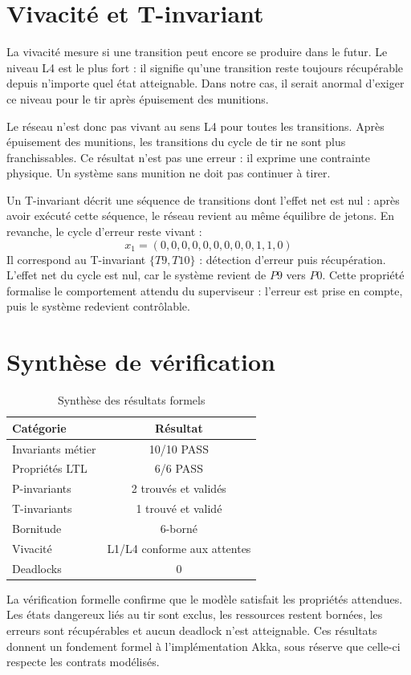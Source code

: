 \documentclass[11pt,a4paper]{report}
\begin{document}
\section{Vivacité et T-invariant}
La vivacité mesure si une transition peut encore se produire dans le futur. Le niveau L4 est le plus fort : il signifie qu'une transition reste toujours récupérable depuis n'importe quel état atteignable. Dans notre cas, il serait anormal d'exiger ce niveau pour le tir après épuisement des munitions.

Le réseau n'est donc pas vivant au sens L4 pour toutes les transitions. Après épuisement des munitions, les transitions du cycle de tir ne sont plus franchissables. Ce résultat n'est pas une erreur : il exprime une contrainte physique. Un système sans munition ne doit pas continuer à tirer.

Un T-invariant décrit une séquence de transitions dont l'effet net est nul : après avoir exécuté cette séquence, le réseau revient au même équilibre de jetons. En revanche, le cycle d'erreur reste vivant :
\[
x_1 = (0,0,0,0,0,0,0,0,0,1,1,0)
\]
Il correspond au T-invariant $\{T9,T10\}$ : détection d'erreur puis récupération. L'effet net du cycle est nul, car le système revient de $P9$ vers $P0$. Cette propriété formalise le comportement attendu du superviseur : l'erreur est prise en compte, puis le système redevient contrôlable.

\section{Synthèse de vérification}
\begin{table}[H]
\centering
\caption{Synthèse des résultats formels}
\begin{tabularx}{0.8\textwidth}{YC}
\toprule
Catégorie & Résultat \\
\midrule
Invariants métier & 10/10 PASS \\
Propriétés LTL & 6/6 PASS \\
P-invariants & 2 trouvés et validés \\
T-invariants & 1 trouvé et validé \\
Bornitude & 6-borné \\
Vivacité & L1/L4 conforme aux attentes \\
Deadlocks & 0 \\
\bottomrule
\end{tabularx}
\end{table}

La vérification formelle confirme que le modèle satisfait les propriétés attendues. Les états dangereux liés au tir sont exclus, les ressources restent bornées, les erreurs sont récupérables et aucun deadlock n'est atteignable. Ces résultats donnent un fondement formel à l'implémentation Akka, sous réserve que celle-ci respecte les contrats modélisés.
\end{document}
